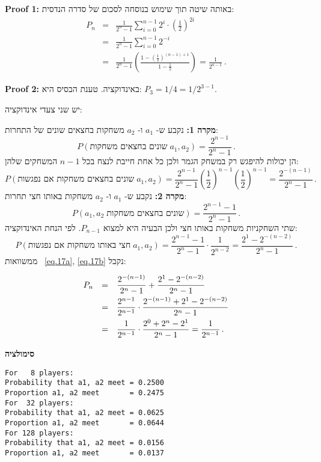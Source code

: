 \textbf{Proof 1:}
באותה שיטה תוך שימוש בנוסחה לסכום של סדרה הנדסית:
\begin{eqnarray*}
P_n&=&\frac{1}{2^n-1}\sum_{i=0}^{n-1}2^i\cdot \left(\frac{1}{2}\right)^{2i}\\
&=&\frac{1}{2^n-1}\sum_{i=0}^{n-1}2^{-i}\\
&=&\frac{1}{2^n-1}
  \left(
    \frac{1-\left(\frac{1}{2}\right)^{(n-1)+1}}
         {1-\frac{1}{2}}
  \right)=\frac{1}{2^{n-1}}\,.
\end{eqnarray*}

\textbf{Proof 2:}
באינדוקציה. טענת הבסיס היא:
$P_3=1/4=1/2^{3-1}$.

יש שני צעדי אינדוקציה:

\textbf{מקרה 1:} 
נקבע ש-%
$a_1$
ו-%
$a_2$
משחקות בחצאים שונים של התחרות:
\[
P(\textrm{שונים בחצאים משחקות}\;a_1,a_2)=\frac{2^{n-1}}{2^n-1}\,.
\]
הן יכולות להיפגש רק במשחק הגמר ולכן כל אחת חייבת לנצח בכל 
$n-1$
המשחקים שלהן:
\begin{equation}\label{eq.17a}
P(\textrm{שונים בחצאים משחקות אם נפגשות}\; a_1,a_2)=\frac{2^{n-1}}{2^n-1} \left(\frac{1}{2}\right)^{n-1} \left(\frac{1}{2}\right)^{n-1}=\frac{2^{-(n-1)}}{2^n-1}\,.
\end{equation}
\textbf{מקרה 2:}
נקבע ש-%
$a_1$
ו-%
$a_2$
משחקות באותו חצי תחרות:
\[
P(a_1,a_2\;\textrm{שונים בחצאים משחקות})=\frac{2^{n-1}-1}{2^n-1}\,.
\]
שתי השחקניות משחקות באותו חצי ולכן הבעיה היא למצוא
$P_{n-1}$.
לפי הנחת האינדוקציה:
\begin{equation}\label{eq.17b}
P(\textrm{חצי באותו משחקות אם נפגשות}\; a_1,a_2)=\frac{2^{n-1}-1}{2^n-1}\cdot \frac{1}{2^{n-2}}=\frac{2^{1}-2^{-(n-2)}}{2^n-1}\,.
\end{equation}
ממשוואות%
~\ref{eq.17a}, \ref{eq.17b}
נקבל:
\[
\renewcommand*{\arraystretch}{2.2}
\begin{array}{rcl}
P_n&=&\disfrac{2^{-(n-1)}}{2^n-1}+\disfrac{2^{1}-2^{-(n-2)}}{2^n-1}\\
&=&\disfrac{2^{n-1}}
        {2^{n-1}}\cdot 
   \disfrac{2^{-(n-1)}+2^{1}-2^{-(n-2)}}
        {2^n-1}\\
&=&\disfrac{1}
        {2^{n-1}}\cdot 
   \disfrac{2^0+2^n-2^1}
        {2^n-1}=\disfrac{1}{2^{n-1}}\,.
\end{array}
\]

\textbf{סימולציה}
\begin{verbatim}
For   8 players:
Probability that a1, a2 meet = 0.2500
Proportion a1, a2 meet       = 0.2475
For  32 players:
Probability that a1, a2 meet = 0.0625
Proportion a1, a2 meet       = 0.0644
For 128 players:
Probability that a1, a2 meet = 0.0156
Proportion a1, a2 meet       = 0.0137
\end{verbatim}

